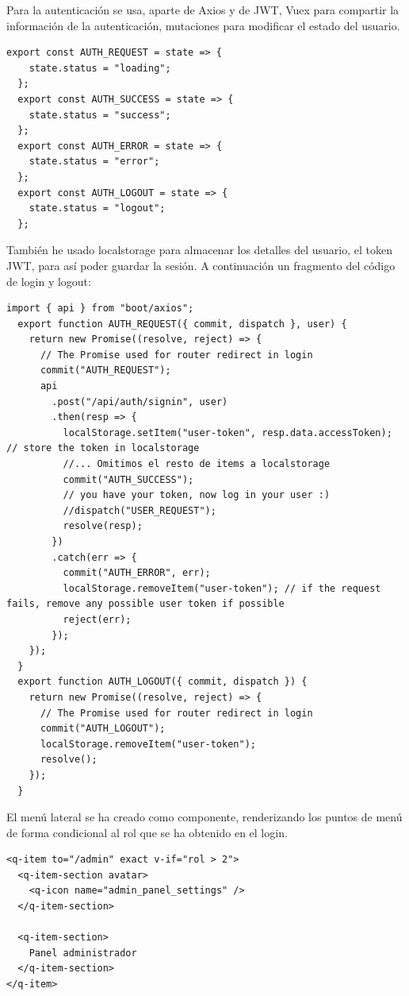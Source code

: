 \documentclass[11pt,spanish,listoffigures,listoftables]{tfgetsinf}
\begin{document}
Para la autenticación se usa, aparte de Axios y de JWT, Vuex para compartir la información de la autenticación, mutaciones para modificar el estado del usuario. 
\begin{lstlisting}[style=ES6, caption={ES6 (ECMAScript-2015) Listing}]
  export const AUTH_REQUEST = state => {
    state.status = "loading";
  };
  export const AUTH_SUCCESS = state => {
    state.status = "success";
  };
  export const AUTH_ERROR = state => {
    state.status = "error";
  };
  export const AUTH_LOGOUT = state => {
    state.status = "logout";
  };
\end{lstlisting}


También he usado localstorage para almacenar los detalles del usuario, el token JWT, para así poder guardar la sesión. A continuación un fragmento del código de login y logout:

\begin{lstlisting}[style=ES6, caption={ES6 (ECMAScript-2015) Listing}]
  import { api } from "boot/axios";
  export function AUTH_REQUEST({ commit, dispatch }, user) {
    return new Promise((resolve, reject) => {
      // The Promise used for router redirect in login
      commit("AUTH_REQUEST");
      api
        .post("/api/auth/signin", user)
        .then(resp => {
          localStorage.setItem("user-token", resp.data.accessToken); // store the token in localstorage
          //... Omitimos el resto de items a localstorage
          commit("AUTH_SUCCESS");
          // you have your token, now log in your user :)
          //dispatch("USER_REQUEST");
          resolve(resp);
        })
        .catch(err => {
          commit("AUTH_ERROR", err);
          localStorage.removeItem("user-token"); // if the request fails, remove any possible user token if possible
          reject(err);
        });
    });
  }  
  export function AUTH_LOGOUT({ commit, dispatch }) {
    return new Promise((resolve, reject) => {
      // The Promise used for router redirect in login
      commit("AUTH_LOGOUT");
      localStorage.removeItem("user-token");
      resolve();
    });
  }
\end{lstlisting}

El menú lateral se ha creado como componente, renderizando los puntos de menú de forma condicional al rol que se ha obtenido en el login.

\begin{lstlisting}[style=ES6, caption={ES6 (ECMAScript-2015) Listing}]
  <q-item to="/admin" exact v-if="rol > 2">
  <q-item-section avatar>
    <q-icon name="admin_panel_settings" />
  </q-item-section>

  <q-item-section>
    Panel administrador
  </q-item-section>
</q-item>
\end{lstlisting}
\end{document}
